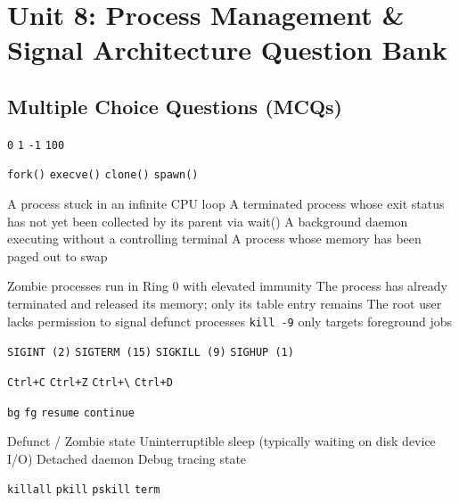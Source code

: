 \chapter{Unit 8: Process Management \& Signal Architecture Question Bank}

\section{Multiple Choice Questions (MCQs)}

{\texttt{0}}
{\texttt{1}}
{\texttt{-1}}
{\texttt{100}}

{\texttt{fork()}}
{\texttt{execve()}}
{\texttt{clone()}}
{\texttt{spawn()}}

{A process stuck in an infinite CPU loop}
{A terminated process whose exit status has not yet been collected by its parent via wait()}
{A background daemon executing without a controlling terminal}
{A process whose memory has been paged out to swap}

{Zombie processes run in Ring 0 with elevated immunity}
{The process has already terminated and released its memory; only its table entry remains}
{The root user lacks permission to signal defunct processes}
{\texttt{kill -9} only targets foreground jobs}

{\texttt{SIGINT (2)}}
{\texttt{SIGTERM (15)}}
{\texttt{SIGKILL (9)}}
{\texttt{SIGHUP (1)}}

{\texttt{Ctrl+C}}
{\texttt{Ctrl+Z}}
{\texttt{Ctrl+\textbackslash}}
{\texttt{Ctrl+D}}

{\texttt{bg}}
{\texttt{fg}}
{\texttt{resume}}
{\texttt{continue}}

{Defunct / Zombie state}
{Uninterruptible sleep (typically waiting on disk device I/O)}
{Detached daemon}
{Debug tracing state}

{\texttt{killall}}
{\texttt{pkill}}
{\texttt{pskill}}
{\texttt{term}}

